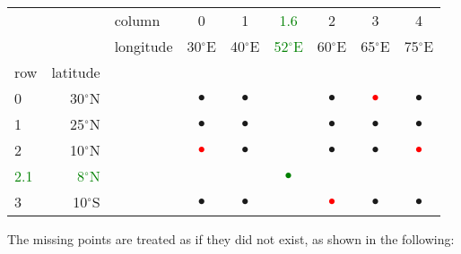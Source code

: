     \begin{tabular}{|lrl|cccccc|}
      \hline 
         & 
         & 
        column & 
        0 & 
        1 & 
	\textcolor{green}{1.6}
         & 
        2 & 
        3 & 
        4
      \\
         & 
         & 
        longitude & 
        30$^{\circ}$E & 
        40$^{\circ}$E & 
	\textcolor{green}{52$^{\circ}$E}
         & 
        60$^{\circ}$E & 
        65$^{\circ}$E & 
        75$^{\circ}$E
      \\
        row & 
        latitude
         & 
         & 
         & 
         & 
         & 
         & 
         & 
      \\
      \hline 
        0 & 
        30$^{\circ}$N & 
         & 
        $\bullet$ & 
        $\bullet$ & 
         & 
        $\bullet$ & 
	\textcolor{red}{$\bullet$} & 
        $\bullet$
      \\
        1 & 
        25$^{\circ}$N & 
         & 
        $\bullet$ & 
        $\bullet$ & 
         & 
        $\bullet$ & 
        $\bullet$ & 
        $\bullet$ 
      \\
        2 & 
        10$^{\circ}$N & 
         & 
	\textcolor{red}{$\bullet$}
         & 
        $\bullet$ & 
         & 
        $\bullet$ & 
        $\bullet$ & 
	\textcolor{red}{$\bullet$}
      \\
	\textcolor{green}{2.1}
         & 
	\textcolor{green}{8$^{\circ}$N}
         & 
         & 
         & 
         & 
\textcolor{green}{$\bullet$}
         & 
         & 
         & 
      \\
        3 & 
        10$^{\circ}$S & 
         & 
        $\bullet$ & 
        $\bullet$ & 
         & 
	\textcolor{red}{$\bullet$}
         & 
        $\bullet$ & 
        $\bullet$
      \\
      \hline 
\end{tabular}

  The missing points are treated as if they did not exist, as shown
  in the following:

